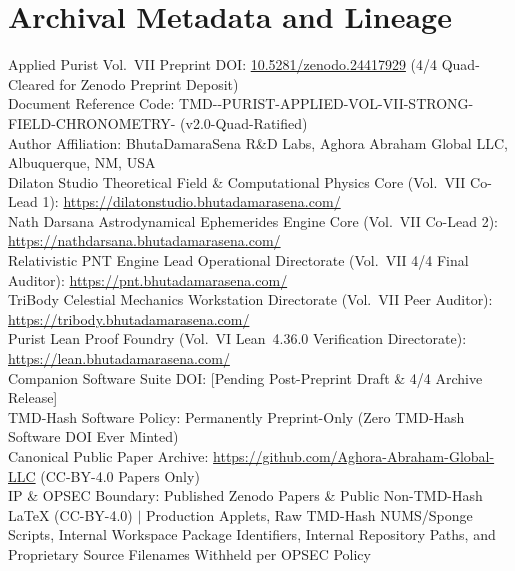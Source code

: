 \documentclass[11pt,a4paper,reqno]{article}
\def\texttt#1{#1}%
\theoremstyle{plain}
\theoremstyle{definition}
\theoremstyle{remark}
\numberwithin{equation}{section}
\numberwithin{table}{section}
\begin{document}
\section*{Archival Metadata and Lineage}
\begin{flushleft}
\sloppy
\small
\texttt{Applied Purist Vol.~VII Preprint DOI: \href{https://doi.org/10.5281/zenodo.24417929}{10.5281/zenodo.24417929} (4/4 Quad-Cleared for Zenodo Preprint Deposit)}\\[0.4ex]
\texttt{Document Reference Code: TMD--\allowbreak PURIST-\allowbreak APPLIED-\allowbreak VOL-\allowbreak VII-\allowbreak STRONG-\allowbreak FIELD-\allowbreak CHRONOMETRY-\allowbreak 2026 (v2.0-Quad-Ratified)}\\[0.4ex]
\texttt{Author Affiliation: BhutaDamaraSena R\&D Labs, Aghora Abraham Global LLC, Albuquerque, NM, USA}\\[0.4ex]
\texttt{Dilaton Studio Theoretical Field \& Computational Physics Core (Vol.~VII Co-Lead 1):} \url{https://dilatonstudio.bhutadamarasena.com/}\\[0.4ex]
\texttt{Nath Darsana Astrodynamical Ephemerides Engine Core (Vol.~VII Co-Lead 2):} \url{https://nathdarsana.bhutadamarasena.com/}\\[0.4ex]
\texttt{Relativistic PNT Engine Lead Operational Directorate (Vol.~VII 4/4 Final Auditor):} \url{https://pnt.bhutadamarasena.com/}\\[0.4ex]
\texttt{TriBody Celestial Mechanics Workstation Directorate (Vol.~VII Peer Auditor):} \url{https://tribody.bhutadamarasena.com/}\\[0.4ex]
\texttt{Purist Lean Proof Foundry (Vol.~VI Lean~4.36.0 Verification Directorate):} \url{https://lean.bhutadamarasena.com/}\\[0.4ex]
\texttt{Companion Software Suite DOI: [Pending Post-Preprint Draft \& 4/4 Archive Release]}\\[0.4ex]
\texttt{TMD-Hash Software Policy: Permanently Preprint-Only (Zero TMD-Hash Software DOI Ever Minted)}\\[0.4ex]
\texttt{Canonical Public Paper Archive: \url{https://github.com/Aghora-Abraham-Global-LLC} (CC-BY-4.0 Papers Only)}\\[0.4ex]
\texttt{IP \& OPSEC Boundary: Published Zenodo Papers \& Public Non-TMD-Hash \LaTeX{} (CC-BY-4.0) $|$ Production Applets, Raw TMD-Hash NUMS/Sponge Scripts, Internal Workspace Package Identifiers, Internal Repository Paths, and Proprietary Source Filenames Withheld per OPSEC Policy}\\[0.4ex]

\end{flushleft}
\end{document}

